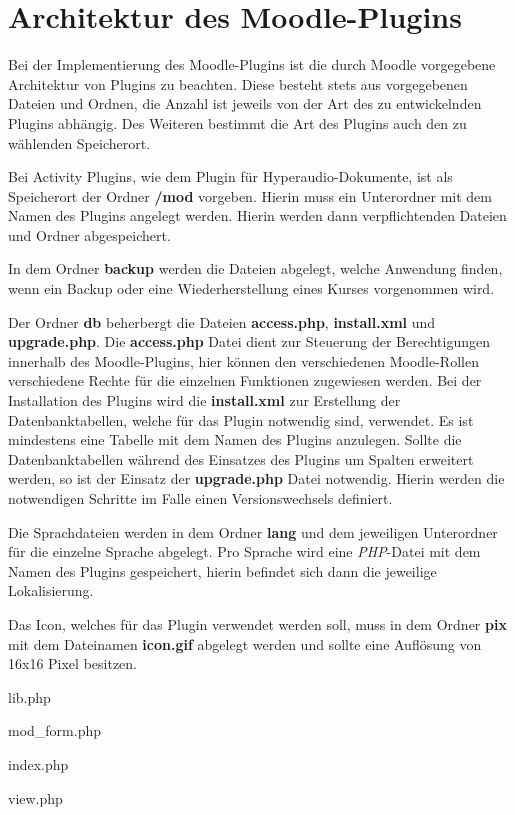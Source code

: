 \section{Architektur des Moodle-Plugins}
Bei der Implementierung des Moodle-Plugins ist die durch Moodle vorgegebene Architektur von Plugins zu beachten. Diese besteht stets aus vorgegebenen Dateien und Ordnen, die Anzahl ist jeweils von der Art des zu entwickelnden Plugins abhängig. Des Weiteren bestimmt die Art des Plugins auch den zu wählenden Speicherort.

Bei Activity Plugins, wie dem Plugin für Hyperaudio-Dokumente, ist als Speicherort der Ordner \textbf{/mod} vorgeben. Hierin muss ein Unterordner mit dem Namen des Plugins angelegt werden. Hierin werden dann verpflichtenden Dateien und Ordner abgespeichert.

In dem Ordner \textbf{backup} werden die Dateien abgelegt, welche Anwendung finden, wenn ein Backup oder eine Wiederherstellung eines Kurses vorgenommen wird.

Der Ordner \textbf{db} beherbergt die Dateien \textbf{access.php}, \textbf{install.xml} und \textbf{upgrade.php}. Die \textbf{access.php} Datei dient zur Steuerung der Berechtigungen innerhalb des Moodle-Plugins, hier können den verschiedenen Moodle-Rollen verschiedene Rechte für die einzelnen Funktionen zugewiesen werden. Bei der Installation des Plugins wird die \textbf{install.xml} zur Erstellung der Datenbanktabellen, welche für das Plugin notwendig sind, verwendet. Es ist mindestens eine Tabelle mit dem Namen des Plugins anzulegen. Sollte die Datenbanktabellen während des Einsatzes des Plugins um Spalten erweitert werden, so ist der Einsatz der \textbf{upgrade.php} Datei notwendig. Hierin werden die notwendigen Schritte im Falle einen Versionswechsels definiert.

Die Sprachdateien werden in dem Ordner \textbf{lang} und dem jeweiligen Unterordner für die einzelne Sprache abgelegt. Pro Sprache wird eine \textit{PHP}-Datei mit dem Namen des Plugins gespeichert, hierin befindet sich dann die jeweilige Lokalisierung.

Das Icon, welches für das Plugin  verwendet werden soll, muss in dem Ordner \textbf{pix} mit dem Dateinamen \textbf{icon.gif} abgelegt werden und sollte eine Auflösung von 16x16 Pixel besitzen.

lib.php

mod\_form.php

index.php

view.php

